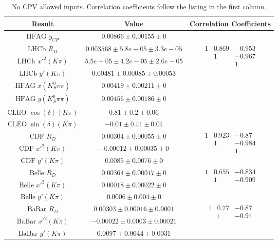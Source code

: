 \begin{table}[htdp]
\begin{center}
\begin{tabular}{|c|c|c|}
\hline
Result & Value & Correlation Coefficients \\
\hline \hline
$\text{HFAG }y_{CP}$ & $0.00866\pm0.00155\pm0$ & \\
\hline
$\text{LHCb }R_D$ & $0.003568\pm5.8e-05\pm3.3e-05$ & \multirow{3}{*}{$\begin{array}{ccc} 
    1 & 0.869& -0.953\\ 
    & 1 & -0.967 \\ 
    & & 1 \end{array}$}\\
$\text{LHCb }x'^2(K\pi)$ & $5.5e-05\pm4.2e-05\pm2.6e-05$ & \\
$\text{LHCb }y'(K\pi)$ & $0.00481\pm0.00085\pm0.00053$ & \\

\hline
$\text{HFAG }x (K_S^0\pi\pi)$ & $0.00419\pm0.00211\pm0$ & \\
$\text{HFAG }y (K_S^0\pi\pi)$ & $0.00456\pm0.00186\pm0$ & \\
\hline
$\text{CLEO }\cos(\delta)(K\pi)$ & $0.81\pm0.2\pm0.06$ & \\
$\text{CLEO }\sin(\delta)(K\pi)$ & $-0.01\pm0.41\pm0.04$ & \\
\hline
$\text{CDF }R_D$ & $0.00304\pm0.00055\pm0$ & \multirow{3}{*}{$\begin{array}{ccc} 
1& 0.923 & -0.87 \\ & 1 & -0.984 \\ & & 1 \end{array}$}\\
$\text{CDF }x'^2(K\pi)$ & $-0.00012\pm0.00035\pm0$ & \\
$\text{CDF }y'(K\pi)$ & $0.0085\pm0.0076\pm0$ & \\
\hline
$\text{Belle }R_D$ & $0.00364\pm0.00017\pm0$ & \multirow{3}{*}{$\begin{array}{ccc}
    1 & 0.655 & -0.834\\
     & 1& -0.909
\end{array}$}\\
$\text{Belle }x'^2(K\pi)$ & $0.00018\pm0.00022\pm0$ & \\
$\text{Belle }y'(K\pi)$ & $0.0006\pm0.004\pm0$ & \\
\hline
$\text{BaBar }R_D$ & $0.00303\pm0.00016\pm0.0001$ & \multirow{3}{*}{$\begin{array}{ccc} 
    1& 0.77 & -0.87 \\
     & 1 & -0.94
\end{array}$}\\
$\text{BaBar }x'^2(K\pi)$ & $-0.00022\pm0.0003\pm0.00021$ & \\
$\text{BaBar }y'(K\pi)$ & $0.0097\pm0.0044\pm0.0031$ & \\
\hline
\end{tabular}
\end{center}
\caption{No CPV allowed inputs. Correlation coefficients follow the listing in the first column.}
\label{table:nocpv_inputs}
\end{table}
